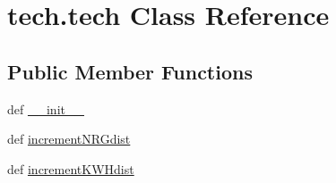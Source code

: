 \hypertarget{classtech_1_1tech}{\section{tech.\-tech Class Reference}
\label{classtech_1_1tech}
}
\subsection*{Public Member Functions}
\begin{DoxyCompactItemize}
\item 
def \hyperlink{classtech_1_1tech_a7ea73e0b33abbf0498535360a6271a56}{\-\_\-\-\_\-init\-\_\-\-\_\-}
\item 
def \hyperlink{classtech_1_1tech_a8c2c8b55f10951ae0827f60a34b4ed4c}{increment\-N\-R\-Gdist}
\item 
def \hyperlink{classtech_1_1tech_a7aaa6a3db1608a99b1970338416fe0c5}{increment\-K\-W\-Hdist}
\end{DoxyCompactItemize}
